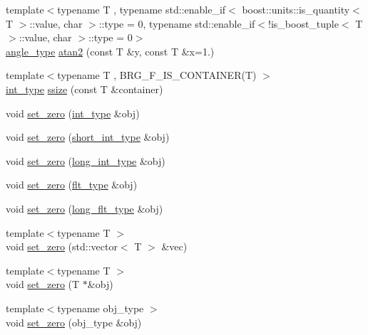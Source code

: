 \begin{DoxyCompactItemize}
\item 
{\footnotesize template$<$typename T , typename std\-::enable\-\_\-if$<$ boost\-::units\-::is\-\_\-quantity$<$ T $>$\-::value, char $>$\-::type  = 0, typename std\-::enable\-\_\-if$<$!is\-\_\-boost\-\_\-tuple$<$ T $>$\-::value, char $>$\-::type  = 0$>$ }\\\hyperlink{namespaceIceBRG_a688eeb0811a2474b20b667ed2e9625a1}{angle\-\_\-type} \hyperlink{namespaceIceBRG_acf53c14d1ce0383c5618779cd4f7aa08}{atan2} (const T \&y, const T \&x=1.)
\item 
{\footnotesize template$<$typename T , B\-R\-G\-\_\-\-F\-\_\-\-I\-S\-\_\-\-C\-O\-N\-T\-A\-I\-N\-E\-R(\-T) $>$ }\\\hyperlink{lib_2IceBRG__main_2common_8h_ac4de9d9335536ac22821171deec8d39e}{int\-\_\-type} \hyperlink{namespaceIceBRG_a1c98028bf4680f4efbc1e733387e8372}{ssize} (const T \&container)
\item 
void \hyperlink{namespaceIceBRG_a60c9c906d9f458bf783e375345e7a4b9}{set\-\_\-zero} (\hyperlink{lib_2IceBRG__main_2common_8h_ac4de9d9335536ac22821171deec8d39e}{int\-\_\-type} \&obj)
\item 
void \hyperlink{namespaceIceBRG_a69aded32f9a7eb7f673e1ee1ee61fc5a}{set\-\_\-zero} (\hyperlink{lib_2IceBRG__main_2common_8h_a9a4c2c3afa89b73437fa1d63d607c7c1}{short\-\_\-int\-\_\-type} \&obj)
\item 
void \hyperlink{namespaceIceBRG_a665dc0f345896d185932ca88f01d047b}{set\-\_\-zero} (\hyperlink{lib_2IceBRG__main_2common_8h_a155f1d4a7ac7ced2a2aa269b30ba2558}{long\-\_\-int\-\_\-type} \&obj)
\item 
void \hyperlink{namespaceIceBRG_a33a8c84fa22b6a3426175293c4a7f2e8}{set\-\_\-zero} (\hyperlink{lib_2IceBRG__main_2common_8h_ad0f130a56eeb944d9ef2692ee881ecc4}{flt\-\_\-type} \&obj)
\item 
void \hyperlink{namespaceIceBRG_a30f227fc88aa56ab4348f5a18a5f1d54}{set\-\_\-zero} (\hyperlink{lib_2IceBRG__main_2common_8h_a7040956e7e1b504d34a9ccfb4253bdce}{long\-\_\-flt\-\_\-type} \&obj)
\item 
{\footnotesize template$<$typename T $>$ }\\void \hyperlink{namespaceIceBRG_a9c366be6b3a40d49d9418d9da8d1a1c6}{set\-\_\-zero} (std\-::vector$<$ T $>$ \&vec)
\item 
{\footnotesize template$<$typename T $>$ }\\void \hyperlink{namespaceIceBRG_ad1026e1aa1d1c1bf6ce4887bc3c7e75e}{set\-\_\-zero} (T $\ast$\&obj)
\item 
{\footnotesize template$<$typename obj\-\_\-type $>$ }\\void \hyperlink{namespaceIceBRG_a22bcc23a96823f19209ee1a872f4b2d5}{set\-\_\-zero} (obj\-\_\-type \&obj)

\end{DoxyCompactItemize}
